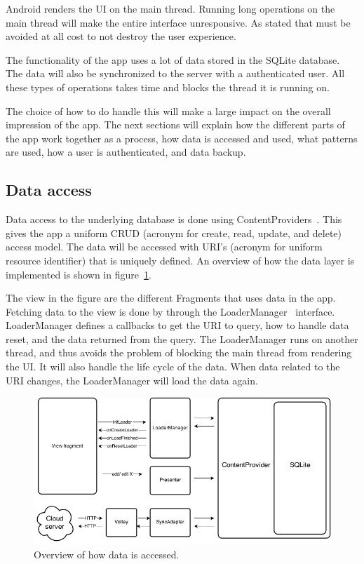 Android renders the UI on the main thread. Running long operations on the main thread will make the entire interface unresponsive. As stated that must be avoided at all cost to not destroy the user experience. 

The functionality of the app uses a lot of data stored in the SQLite database. The data will also be synchronized to the server with a authenticated user. All these types of operations takes time and blocks the thread it is running on.

The choice of how to do handle this will make a large impact on the overall impression of the app. The next sections will explain how the different parts of the app work together as a process, how data is accessed and used, what patterns are used, how a user is authenticated, and data backup.


\subsection{Data access}
Data access to the underlying database is done using ContentProviders~\cite{contentproviders}. This gives the app a uniform \gls{CRUD} (acronym for create, read, update, and delete) access model. The data will be accessed with \gls{URI}'s (acronym for uniform resource identifier) that is uniquely defined. An overview of how the data layer is implemented is shown in figure~\ref{fig:archAppOverview}.

The view in the figure are the different Fragments that uses data in the app. Fetching data to the view is done by through the LoaderManager~\cite{loadermanager} interface. LoaderManager  defines a callbacks to get the URI to query, how to handle data reset, and the data returned from the query. The LoaderManager runs on another thread, and thus avoids the problem of blocking the main thread from rendering the UI. It will also handle the life cycle of the data. When data related to the URI changes, the LoaderManager will load the data again. 

\begin{figure}[H]
\includegraphics[width=\textwidth]{ch/architecture/fig/arch_app_overview.png}
\caption{Overview of how data is accessed.}
\label{fig:archAppOverview}
\end{figure}

